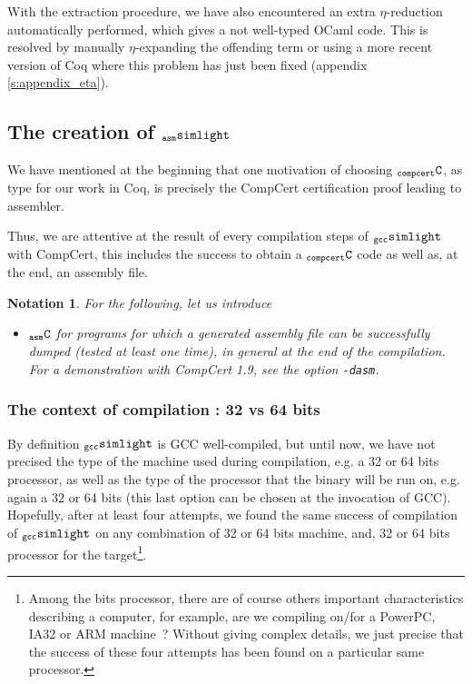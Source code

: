 \documentclass[a4paper, 11pt]{article}
\newcommand{\compcert}{CompCert 1.9\xspace}
\newcommand{\ccert}{CompCert\xspace}
\newcommand{\gccSL}{$_{\tt gcc}{\tt simlight}$\xspace}
\newcommand{\aSL}{$_{\tt asm}{\tt simlight}$\xspace} %
\newcommand{\C}{$_{\tt compcert}{\tt C}$\xspace}
\newcommand{\aC}{$_{\tt asm}{\tt C}$\xspace}
\newtheorem*{note}{Notation}
\begin{document}
With the extraction procedure, we have also encountered an extra $\eta$-reduction automatically performed, which gives a not well-typed OCaml code. This is resolved by manually $\eta$-expanding the offending term or using a more recent version of Coq where this problem has just been fixed (appendix \ref{s:appendix_eta}).

\subsection{The creation of \aSL}
We have mentioned at the beginning that one motivation of choosing \C, as type for our work in Coq, is precisely the \ccert certification proof leading to assembler.

Thus, we are attentive at the result of every compilation steps of \gccSL with \ccert, this includes the success to obtain a \C code as well as, at the end, an assembly file.

\begin{note}
For the following, let us introduce
\begin{itemize}
\item \aC for programs for which a generated assembly file can be successfully dumped (tested at least one time), in general at the end of the compilation. For a demonstration with \compcert, see the option \verb|-dasm|.
\end{itemize}
\end{note}

\subsubsection{The context of compilation : 32 vs 64 bits}
\label{s:ctx_compil}
By definition \gccSL is GCC well-compiled, but until now, we have not precised the type of the machine used during compilation, e.g. a 32 or 64 bits processor, as well as the type of the processor that the binary will be run on, e.g. again a 32 or 64 bits (this last option can be chosen at the invocation of GCC). Hopefully, after at least four attempts, we found the same success of compilation of \gccSL on any combination of 32 or 64 bits machine, and, 32 or 64 bits processor for the target\footnote{Among the bits processor, there are of course others important characteristics describing a computer, for example, are we compiling on/for a PowerPC, IA32 or ARM machine~? Without giving complex details, we just precise that the success of these four attempts has been found on a particular same processor.}.
\end{document}
